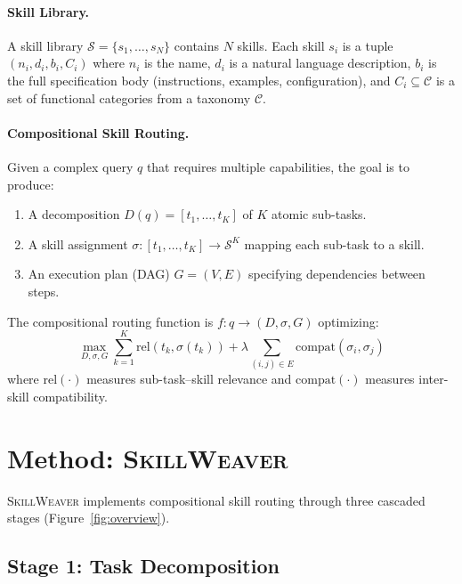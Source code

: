 \documentclass[11pt]{article}
\newcommand{\system}{\textsc{SkillWeaver}}
\begin{document}
\paragraph{Skill Library.}
A skill library $\mathcal{S} = \{s_1, \ldots, s_N\}$ contains $N$ skills.
Each skill $s_i$ is a tuple $(n_i, d_i, b_i, C_i)$ where $n_i$ is the name, $d_i$ is a natural language description, $b_i$ is the full specification body (instructions, examples, configuration), and $C_i \subseteq \mathcal{C}$ is a set of functional categories from a taxonomy $\mathcal{C}$.

\paragraph{Compositional Skill Routing.}
Given a complex query $q$ that requires multiple capabilities, the goal is to produce:
\begin{enumerate}[nosep,leftmargin=*]
  \item A decomposition $D(q) = [t_1, \ldots, t_K]$ of $K$ atomic sub-tasks.
  \item A skill assignment $\sigma: [t_1, \ldots, t_K] \to \mathcal{S}^K$ mapping each sub-task to a skill.
  \item An execution plan (DAG) $G = (V, E)$ specifying dependencies between steps.
\end{enumerate}

The compositional routing function is $f: q \to (D, \sigma, G)$ optimizing:
\begin{equation}
\max_{D, \sigma, G} \sum_{k=1}^{K} \text{rel}(t_k, \sigma(t_k)) + \lambda \!\!\!\sum_{(i,j) \in E}\!\!\! \text{compat}(\sigma_i, \sigma_j)
\end{equation}
where $\text{rel}(\cdot)$ measures sub-task--skill relevance and $\text{compat}(\cdot)$ measures inter-skill compatibility.

\section{Method: \system{}}
\label{sec:method}

\system{} implements compositional skill routing through three cascaded stages (Figure~\ref{fig:overview}).

\subsection{Stage 1: Task Decomposition}
\end{document}

